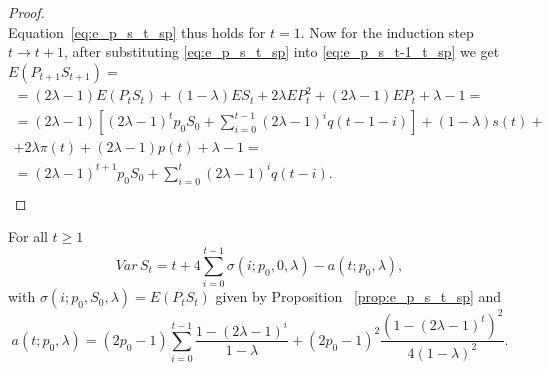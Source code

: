 \documentclass[runningheads]{CMSIM}
\begin{document}
\begin{proof}
\[        \]
        Equation~\eqref{eq:e_p_s_t_sp} thus holds for $t=1$.
        Now for the
        induction step $t\rightarrow t+1$, after substituting \eqref{eq:e_p_s_t_sp}
        into \eqref{eq:e_p_s_t-1_t_sp} we get $E(P_{t+1}S_{t+1})=$
        \begin{gather*}
            =(2\lambda-1)E(P_{t}S_{t})+(1-\lambda)ES_{t}+2\lambda EP_{t}^{2}+(2\lambda-1)EP_{t}+\lambda-1=\\
            =(2\lambda-1)[(2\lambda-1)^{t}p_{0}S_{0}+\sum_{i=0}^{t-1}(2\lambda-1)^{i}q(t-1-i)]+(1-\lambda)s(t)+\\
            +2\lambda\pi(t)+(2\lambda-1)p(t)+\lambda-1=\\
            =(2\lambda-1)^{t+1}p_{0}S_{0}+\sum_{i=0}^{t}(2\lambda-1)^{i}q(t-i).\\
        \end{gather*}
    \end{proof}
    \begin{theorem}
        \label{thm:VarSt_sp}For all $t\ge1$
        \[
            Var\,S_{t}=t+4\sum_{i=0}^{t-1}\sigma(i;p_{0},0,\lambda)-a(t;p_{0},\lambda),
        \]
        with $\sigma(i;p_{0},S_{0},\lambda)=E(P_{t}S_{t})$ given by Proposition ~\ref{prop:e_p_s_t_sp}
        and
        \[
            a(t;p_{0},\lambda)=(2p_{0}-1)\sum_{i=0}^{t-1}\frac{1-(2\lambda-1)^{i}}{1-\lambda}+(2p_{0}-1)^{2}\frac{(1-(2\lambda-1)^{t})^{2}}{4(1-\lambda)^{2}}.
        \]
    \end{theorem}
\end{document}
